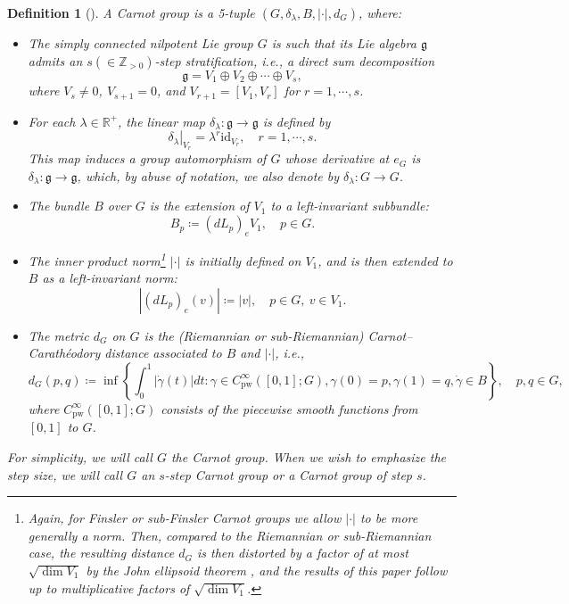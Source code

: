 \documentclass[11pt,reqno]{amsart}
\newtheorem{definition}[theorem]{Definition}
\newcommand{\1}{\mathbf 1}
\newcommand{\bbr}{\mathbb R}
\begin{document}
\begin{definition}[{\cite[Section 3.3]{le2017primer}}]\label{def:carnot}
A \emph{Carnot group} is a 5-tuple $\left(G,\delta_\lambda,B,\left|\cdot \right|,d_G\right)$, where:
\begin{itemize}
    \item The simply connected nilpotent Lie group $G$ is such that its Lie algebra $\mathfrak{g}$ admits an \emph{$s(\in \mathbb{Z}_{>0})$-step stratification}, i.e., a direct sum decomposition
    \[
    \mathfrak{g}=V_1\oplus V_2\oplus\cdots\oplus V_s,
    \]
    where $V_s\neq 0$, $V_{s+1}=0$, and $V_{r+1}=\left[V_1,V_r\right]$ for $r=1,\cdots,s$. 
    \item For each $\lambda\in \bbr^+$, the linear map $\delta_\lambda:\mathfrak{g}\to \mathfrak{g}$ is defined by
    \[
    \left.\delta_\lambda\right|_{V_r}=\lambda^r \mathrm{id}_{V_r},\quad r=1,\cdots,s.
    \]
    This map induces a group automorphism of $G$ whose derivative at $e_G$ is $\delta_\lambda:\mathfrak{g}\to\mathfrak{g}$, which, by abuse of notation, we also denote by $\delta_\lambda:G\to G$.
    \item The bundle $B$ over $G$ is the extension of $V_1$ to a left-invariant subbundle:
    \[
    B_p\coloneqq \left(dL_p\right)_e V_1,\quad p\in G.
    \]
    \item The inner product norm\footnote{Again, for Finsler or sub-Finsler Carnot groups we allow $\left|\cdot \right|$ to be more generally a norm. Then, compared to the Riemannian or sub-Riemannian case, the resulting distance $d_G$ is then distorted by a factor of at most $\sqrt{\operatorname{dim}V_1}$ by the John ellipsoid theorem \cite{john1948extremum}, and the results of this paper follow up to multiplicative factors of  $\sqrt{\operatorname{dim}V_1}$.} $\left|\cdot \right|$ is initially defined on $V_1$, and is then extended to $B$ as a left-invariant norm:
    \[
    \left|\left(dL_p\right)_e\left(v\right)\right|\coloneqq \left|v\right|,\quad p\in G,~v\in V_1.
    \]
    \item The metric $d_G$ on $G$ is the (Riemannian or sub-Riemannian) \textit{Carnot--Carath\'eodory distance} associated to $B$ and $\left|\cdot \right|$, i.e.,
    \[
    d_G\left(p,q\right)\coloneqq \inf\left\{\int_0^1 \left|\dot{\gamma}\left(t\right)\right|dt : \gamma\in C_{\mathrm{pw}}^\infty \left(\left[0,1\right];G\right),\gamma\left(0\right)=p,\gamma\left(1\right)=q,\dot{\gamma}\in B \right\},\quad p,q\in G,
    \]
    where $C_{\mathrm{pw}}^\infty \left(\left[0,1\right];G\right)$ consists of the piecewise smooth functions from $\left[0,1\right]$ to $G$.
\end{itemize}
For simplicity, we will call $G$ the Carnot group. When we wish to emphasize the step size, we will call $G$ an $s$-step Carnot group or a Carnot group of step $s$.
\end{definition}
\end{document}
